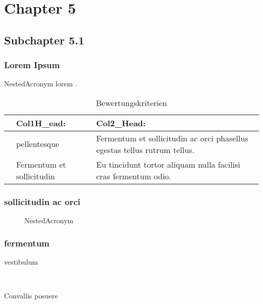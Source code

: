 \documentclass[../main.tex]{subfiles}
\begin{document}
\clearpage
\section{Chapter 5}

\subsection{Subchapter 5.1}

\subsubsection{Lorem Ipsum}

\lipsum[1] \gls{NestedAcronym} lorem 
\lipsum[2] .

\begin{table}[H]
	\centering
	\setcounter{magicrownumbers}{0}
	\begin{tabularx}{\textwidth}{p{2pt} m{40mm} X}
		\toprule
		           & \textbf{Col1H\_ead}:      & \textbf{Col2\_Head}:                                                      \\
		\midrule\morecmidrules\midrule
		\rownumber & pellentesque              & Fermentum et sollicitudin ac orci phasellus egestas tellus rutrum tellus. \\
		\midrule
		\rownumber & Fermentum et sollicitudin & Eu tincidunt tortor aliquam nulla facilisi cras fermentum odio.           \\
		\bottomrule
	\end{tabularx}
	\caption{Bewertungskriterien}
	\label{tab:Bewertungskriterien}
\end{table}

\pagebreak

\subsubsection{sollicitudin ac orci}
\lipsum[1] 
\begin{figure}[H]
	\centering
	\caption{\protect \glsdesc{NestedAcronym}}
	\label{fig:egestas}
\end{figure}


\subsubsection{fermentum}
\lipsum[1]

\begin{description}
	\item[vestibulum] \hfill \\
	      \lipsum[1]

	\item[Convallis posuere] \hfill \\
	      \lipsum[2]

\end{description}


\end{document}
